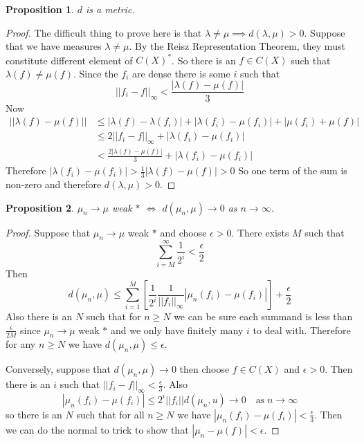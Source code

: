 \documentclass[11pt]{article}
\newcommand{\abs}[1]{\left|#1\right|}
\newcommand{\norm}[1]{\left|\left|#1\right|\right|}
\newtheorem{prop}{Proposition}[section]
\begin{document}
\begin{prop}
$d$ is a metric.
\end{prop}

\begin{proof}
The difficult thing to prove here is that $\lambda \neq \mu \implies d(\lambda, \mu ) > 0$.
Suppose that we have measures $\lambda \neq \mu$.
By the Reisz Representation Theorem, they must constitute different element of $C(X)^\ast$.
So there is an $f\in C(X)$ such that $\lambda(f)\neq \mu(f)$.
Since the $f_i$ are dense there is some $i$ such that
\[
	\norm{f_i-f}_\infty < \frac{\abs{\lambda(f)-\mu(f)}}{3}
\]
Now
\begin{align*}
	\norm{\lambda(f)-\mu(f)} & \leq \abs{\lambda(f) - \lambda(f_i)} + \abs{\lambda(f_i) - \mu(f_i)} + \abs{\mu(f_i) + \mu(f)} \\
							 & \leq 2 \norm{f_i - f}_\infty + \abs{\lambda(f_i) - \mu(f_i)}\\
							 & < \frac{2\abs{\lambda(f) - \mu(f)}}{3} + \abs{\lambda(f_i) - \mu(f_i)}
\end{align*}
Therefore $\abs{\lambda(f_i)- \mu(f_i)} > \frac{1}{3}\abs{\lambda(f) - \mu(f)} > 0$
So one term of the sum is non-zero and therefore $d(\lambda, \mu) >0$.
\end{proof}

\begin{prop}
$\mu_n \to \mu$ weak $\ast$ $\iff$ $d(\mu_n, \mu)\to 0$ as $n\to\infty$.
\end{prop}

\begin{proof}
Suppose that $\mu_n \to \mu$ weak $\ast$ and choose $\epsilon > 0$.
There exists $M$ such that
\[
	\sum_{i=M}^\infty\frac{1}{2^i}< \frac{\epsilon}{2}
\]
Then 
\[
	d(\mu_n, \mu) \leq \sum_{i=1}^{M}\left[ \frac{1}{2^i}\frac{1}{\norm{f_i}_\infty}\abs{\mu_n(f_i) - \mu(f_i)}\right] + \frac{\epsilon}{2}
\]
Also there is an $N$ such that for $n\geq N$ we can be sure each summand is less than $\frac{\epsilon}{2M}$ since $\mu_n\to \mu$ weak $\ast$ and we only have finitely many $i$ to deal with.
Therefore for any $n\geq N$ we have $d(\mu_n , \mu) \leq \epsilon$.

Conversely, suppose that $d(\mu_n, \mu)\to 0$ then choose $f\in C(X)$ and $\epsilon >0$.
Then there is an $i$ such that $\norm{f_i -f}_\infty < \frac{\epsilon}{3}$.
Also
\[
	\abs{\mu_n(f_i)-\mu(f_i)}\leq 2^i\norm{f_i}d(\mu_n, u) \to 0 \quad \text{as}\; n\to\infty
\]
so there is an $N$ such that for all $n\geq N$ we have $\abs{\mu_n(f_i) - \mu(f_i)} < \frac{\epsilon}{3}$.
Then we can do the normal to trick to show that $\abs{\mu_n - \mu(f)}< \epsilon$.
\end{proof}
\end{document}
